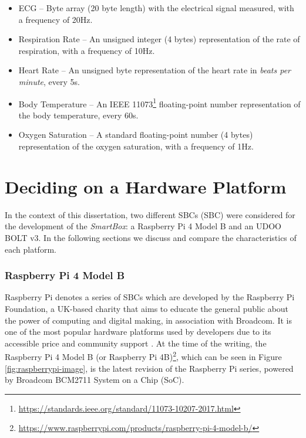 \begin{itemize}
    \item \acf{ECG} -- Byte array (20 byte length) with the electrical signal measured, with a frequency of 20Hz.
    \item Respiration Rate -- An unsigned integer (4 bytes) representation of the rate of respiration, with a frequency of 10Hz.
    \item Heart Rate -- An unsigned byte representation of the heart rate in \textit{beats per minute}, every 5s.
    \item Body Temperature -- An IEEE 11073\footnote{\url{https://standards.ieee.org/standard/11073-10207-2017.html}} floating-point number representation of the body temperature, every 60s.
    \item Oxygen Saturation -- A standard floating-point number (4 bytes) representation of the oxygen saturation, with a frequency of 1Hz.
\end{itemize}

\section{Deciding on a Hardware Platform}

In the context of this dissertation, two different \acl{SBC}s (\acs{SBC}) were considered for the development of the \textit{SmartBox}: a Raspberry Pi 4 Model B and an UDOO BOLT v3. In the following sections we discuss and compare the characteristics of each platform. 

\subsubsection{Raspberry Pi 4 Model B}

Raspberry Pi denotes a series of \acs{SBC}s which are developed by the Raspberry Pi Foundation, a UK-based charity that aims to educate the general public about the power of computing and digital making, in association with Broadcom. It is one of the most popular hardware platforms used by developers due to its accessible price and community support \cite{jain2021introduction}.
At the time of the writing, the Raspberry Pi 4 Model B (or Raspberry Pi 4B)\footnote{\url{https://www.raspberrypi.com/products/raspberry-pi-4-model-b/}}, which can be seen in Figure \ref{fig:raspberrypi-image}, is the latest revision of the Raspberry Pi series, powered by Broadcom BCM2711 System on a Chip (SoC).

